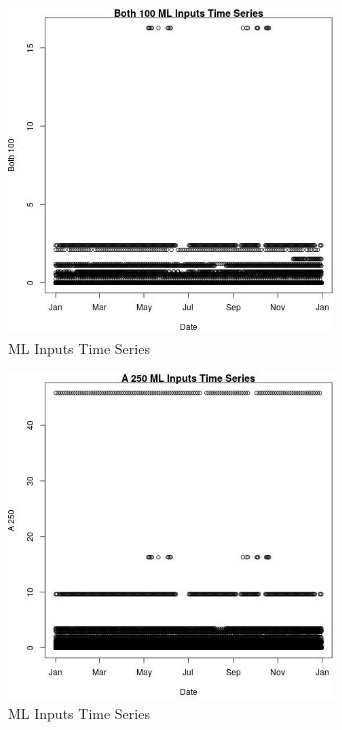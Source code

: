 \begin{figure} 
\centering  
\includegraphics[width=0.77\textwidth]{Code_Outputs/Report_ML_input_PM25_Step4_part_e_de_duplicated_aves_Both_100vDate.jpg} 
\caption{\label{fig:Report_ML_input_PM25_Step4_part_e_de_duplicated_avesBoth_100vDate}ML Inputs Time Series} 
\end{figure} 
 

\begin{figure} 
\centering  
\includegraphics[width=0.77\textwidth]{Code_Outputs/Report_ML_input_PM25_Step4_part_e_de_duplicated_aves_A_250vDate.jpg} 
\caption{\label{fig:Report_ML_input_PM25_Step4_part_e_de_duplicated_avesA_250vDate}ML Inputs Time Series} 
\end{figure} 
 

